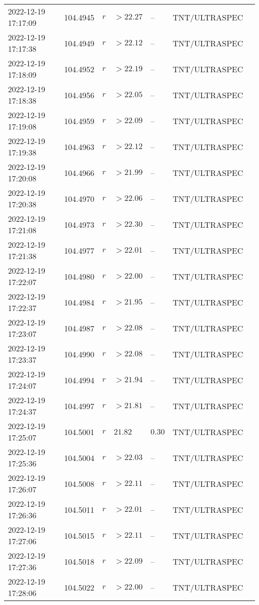 \documentclass{nature_plusfigure}
\begin{document}
\begin{supplement}
\begin{center}
\begin{longtable}{lllllll}
2022-12-19 17:17:09 & 104.4945 & $r$ & $>22.27$ & -- & TNT/ULTRASPEC &  \\ 
2022-12-19 17:17:38 & 104.4949 & $r$ & $>22.12$ & -- & TNT/ULTRASPEC &  \\ 
2022-12-19 17:18:09 & 104.4952 & $r$ & $>22.19$ & -- & TNT/ULTRASPEC &  \\ 
2022-12-19 17:18:38 & 104.4956 & $r$ & $>22.05$ & -- & TNT/ULTRASPEC &  \\ 
2022-12-19 17:19:08 & 104.4959 & $r$ & $>22.09$ & -- & TNT/ULTRASPEC &  \\ 
2022-12-19 17:19:38 & 104.4963 & $r$ & $>22.12$ & -- & TNT/ULTRASPEC &  \\ 
2022-12-19 17:20:08 & 104.4966 & $r$ & $>21.99$ & -- & TNT/ULTRASPEC &  \\ 
2022-12-19 17:20:38 & 104.4970 & $r$ & $>22.06$ & -- & TNT/ULTRASPEC &  \\ 
2022-12-19 17:21:08 & 104.4973 & $r$ & $>22.30$ & -- & TNT/ULTRASPEC &  \\ 
2022-12-19 17:21:38 & 104.4977 & $r$ & $>22.01$ & -- & TNT/ULTRASPEC &  \\ 
2022-12-19 17:22:07 & 104.4980 & $r$ & $>22.00$ & -- & TNT/ULTRASPEC &  \\ 
2022-12-19 17:22:37 & 104.4984 & $r$ & $>21.95$ & -- & TNT/ULTRASPEC &  \\ 
2022-12-19 17:23:07 & 104.4987 & $r$ & $>22.08$ & -- & TNT/ULTRASPEC &  \\ 
2022-12-19 17:23:37 & 104.4990 & $r$ & $>22.08$ & -- & TNT/ULTRASPEC &  \\ 
2022-12-19 17:24:07 & 104.4994 & $r$ & $>21.94$ & -- & TNT/ULTRASPEC &  \\ 
2022-12-19 17:24:37 & 104.4997 & $r$ & $>21.81$ & -- & TNT/ULTRASPEC &  \\ 
2022-12-19 17:25:07 & 104.5001 & $r$ & $21.82$ & $0.30$ & TNT/ULTRASPEC &  \\ 
2022-12-19 17:25:36 & 104.5004 & $r$ & $>22.03$ & -- & TNT/ULTRASPEC &  \\ 
2022-12-19 17:26:07 & 104.5008 & $r$ & $>22.11$ & -- & TNT/ULTRASPEC &  \\ 
2022-12-19 17:26:36 & 104.5011 & $r$ & $>22.01$ & -- & TNT/ULTRASPEC &  \\ 
2022-12-19 17:27:06 & 104.5015 & $r$ & $>22.11$ & -- & TNT/ULTRASPEC &  \\ 
2022-12-19 17:27:36 & 104.5018 & $r$ & $>22.09$ & -- & TNT/ULTRASPEC &  \\ 
2022-12-19 17:28:06 & 104.5022 & $r$ & $>22.00$ & -- & TNT/ULTRASPEC &  \\ 

\end{longtable}
\end{center}
\end{supplement}
\end{document}
